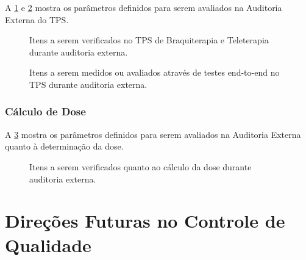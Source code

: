 \documentclass[11pt,a4paper]{article}
\begin{document}
	A \ref{fig:aeTpsBraqVeri} e \ref{fig:aeTpsTeleE2e} mostra os parâmetros definidos para serem avaliados na Auditoria Externa do TPS.

	\begin{figure}[h]
		\centering
		\caption{Itens a serem verificados no TPS de Braquiterapia e Teleterapia durante auditoria externa.}
		\label{fig:aeTpsBraqVeri}
	\end{figure}

	\begin{figure}[h]
		\centering
		\caption{Itens a serem medidos ou avaliados através de testes end-to-end no TPS durante auditoria externa.}
		\label{fig:aeTpsTeleE2e}
	\end{figure}

\subsubsection*{Cálculo de Dose}

	A \ref{fig:aeTpsDose} mostra os parâmetros definidos para serem avaliados na Auditoria Externa quanto à determinação da dose.

	\begin{figure}[h]
		\centering
		\caption{Itens a serem verificados quanto ao cálculo da dose durante auditoria externa.}
		\label{fig:aeTpsDose}
	\end{figure}


\section{Direções Futuras no Controle de Qualidade}
\end{document}
